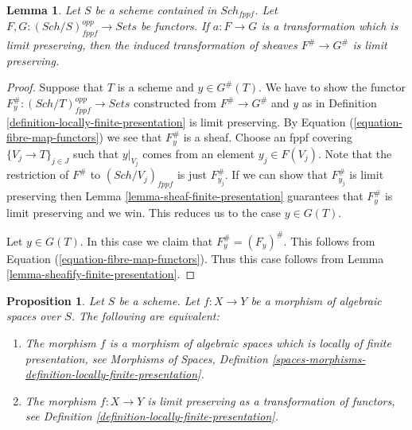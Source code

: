 \documentclass{stacks-project}
\theoremstyle{plain}
\newtheorem{proposition}[subsection]{Proposition}
\newtheorem{lemma}[subsection]{Lemma}
\theoremstyle{definition}
\theoremstyle{remark}
\numberwithin{equation}{subsection}
\def\Sch{\mathit{Sch}}
\begin{document}
\begin{lemma}
\label{lemma-sheafify-finite-presentation-map}
Let $S$ be a scheme contained in $\Sch_{fppf}$.
Let $F, G : (\Sch/S)_{fppf}^{opp} \to \textit{Sets}$ be functors.
If $a : F \to G$ is a transformation which is limit preserving,
then the induced transformation of sheaves
$F^\# \to G^\#$ is limit preserving.
\end{lemma}

\begin{proof}
Suppose that $T$ is a scheme and $y \in G^\#(T)$.
We have to show the functor
$F^\#_y : (\Sch/T)_{fppf}^{opp} \to \textit{Sets}$
constructed from $F^\# \to G^\#$ and $y$ as in
Definition \ref{definition-locally-finite-presentation}
is limit preserving.
By Equation (\ref{equation-fibre-map-functors})
we see that $F^\#_y$ is a sheaf. Choose an fppf covering
$\{V_j \to T\}_{j \in J}$ such that $y|_{V_j}$ comes from
an element $y_j \in F(V_j)$.
Note that the restriction of $F^\#$ to $(\Sch/V_j)_{fppf}$
is just $F^\#_{y_j}$. If we can show that $F^\#_{y_j}$ is
limit preserving then
Lemma \ref{lemma-sheaf-finite-presentation}
guarantees that $F^\#_y$ is limit preserving and
we win. This reduces us to the case $y \in G(T)$.

\medskip\noindent
Let $y \in G(T)$. In this case we claim that $F^\#_y = (F_y)^\#$.
This follows from
Equation (\ref{equation-fibre-map-functors}).
Thus this case follows from
Lemma \ref{lemma-sheafify-finite-presentation}.
\end{proof}

\begin{proposition}
\label{proposition-characterize-locally-finite-presentation}
Let $S$ be a scheme. Let $f : X \to Y$ be a morphism of algebraic
spaces over $S$. The following are equivalent:
\begin{enumerate}
\item The morphism $f$ is a morphism of algebraic spaces which is
locally of finite presentation, see
Morphisms of Spaces,
Definition \ref{spaces-morphisms-definition-locally-finite-presentation}.
\item The morphism $f : X \to Y$ is limit preserving as
a transformation of functors, see
Definition \ref{definition-locally-finite-presentation}.
\end{enumerate}
\end{proposition}
\end{document}
